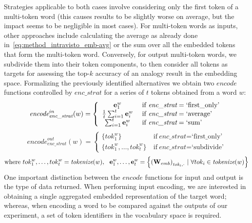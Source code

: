 Strategies applicable to both cases involve considering only the first token of a multi-token word (this causes results to be slightly worse on average, but the impact seems to be negligible in most cases).
For multi-token words as inputs, other approaches include calculating the average as already done in~\cref{eq:method_intravisto_emb-avg} or the sum over all the embedded tokens that form the multi-token word.
Conversely, for output multi-token words, we subdivide them into their token components, to then consider all tokens as targets for assessing the top-$k$ accuracy of an analogy result in the embedding space.
Formalizing the previously identified alternatives we obtain two $\textit{encode}$ functions controlled by $\textit{enc\_strat}$ for a series of $t$ tokens obtained from a word $w$:
\begin{equation}
    \label{eq:method_embeddings_multitok-in}
    {\textit{encode}}_{\textit{enc\_strat}}^{in}(w) = 
    \left\{
    \begin{array}{cl}
        \gbm{e}_1^w &\ \text{if}\ \textit{enc\_strat} = \text{`first\_only'} \\
        \frac{1}{t}\sum_{i=1}^{t}{\gbm{e}_i^w} &\ \text{if}\ \textit{enc\_strat} = \text{`average'} \\
        \sum_{i=1}^{t}{\gbm{e}_i^w} &\ \text{if}\ \textit{enc\_strat} = \text{`sum'}
    \end{array}
    \right.
\end{equation}
\begin{equation}
    \label{eq:method_embeddings_multitok-out}
    {\textit{encode}}_{\textit{enc\_strat}}^{out}(w) = 
    \left\{
    \begin{array}{cl}
        \{ tok_1^w \} &\ \text{if}\ \textit{enc\_strat} = \text{`first\_only'} \\
        \{ tok_1^w, \ldots, tok_t^w \} &\ \text{if}\ \textit{enc\_strat} = \text{`subdivide'}
    \end{array}
    \right.
\end{equation}
\vspace{0.25em}
\begin{equation*}
    \text{where}\  tok_1^w,\ldots,tok_t^w = \textit{tokenize}(w)
    ,\ \ \bm{\mathbf{e}}_1^w, \ldots, \bm{\mathbf{e}}_{t}^w = \Bigl\{ {{(\bm{\mathbf{W}}_{emb})}_{\textit{tok}_{i},\cdot}} \ |\ \forall tok_i \in \textit{tokenize}(w) \Bigr\}
\end{equation*}
One important distinction between the $\textit{encode}$ functions for input and output is the type of data returned.
When performing input encoding, we are interested in obtaining a single aggregated embedded representation of the target word; whereas, when encoding a word to be compared against the outputs of our experiment, a set of token identifiers in the vocabulary space is required.
